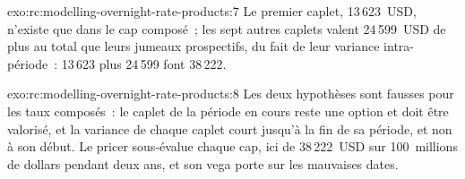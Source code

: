 \begin{solution}{exo:rc:modelling-overnight-rate-products:7}
Le premier caplet, 13\,623~USD, n'existe que dans le cap composé~; les sept autres
caplets valent 24\,599~USD de plus au total que leurs jumeaux prospectifs, du fait de
leur variance intra-période~: 13\,623 plus 24\,599 font 38\,222.
\end{solution}

\begin{solution}{exo:rc:modelling-overnight-rate-products:8}
Les deux hypothèses sont fausses pour les taux composés~: le caplet de la période en cours
reste une option et doit être valorisé, et la variance de chaque caplet court jusqu'à la fin de
sa période, et non à son début. Le pricer sous-évalue chaque cap, ici de 38\,222~USD
sur 100~millions de dollars pendant deux ans, et son vega porte sur les mauvaises dates.
\end{solution}

